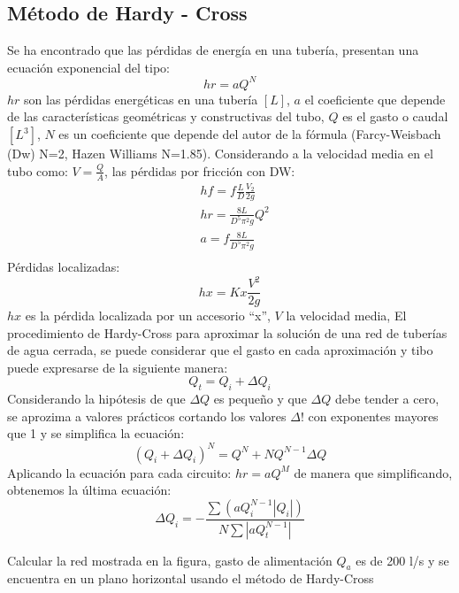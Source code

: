 \subsection{Método de Hardy - Cross}

Se ha encontrado que las pérdidas de energía en una tubería, presentan una ecuación exponencial del tipo:
\begin{equation}
    hr = aQ^N
\end{equation}
$hr$ son las pérdidas energéticas en una tubería $[L]$, $a$ el coeficiente que depende de las características geométricas y constructivas del tubo, $Q$ es el gasto o caudal $[L^3]$, $N$ es un coeficiente que depende del autor de la fórmula (Farcy-Weisbach (Dw) N=2, Hazen Williams N=1.85). Considerando a la velocidad media en el tubo como: $V=\frac{Q}{A}$, las pérdidas por fricción con DW:
\begin{align*}
    &hf = f\frac{L}{D}\frac{V_2}{2g}\\
    &hr = \frac{8L}{D^5\pi^2g}Q^2\\
    &a = f\frac{8L}{D^5\pi^2g}\\
\end{align*}
Pérdidas localizadas:
\begin{equation}
    hx = Kx\frac{V^2}{2g}
\end{equation}
$hx$ es la pérdida localizada por un accesorio ``x'', $V$ la velocidad media,
El procedimiento de Hardy-Cross para aproximar la solución de una red de tuberías de agua cerrada, se puede considerar que el gasto en cada aproximación y tibo puede expresarse de la siguiente manera:
\begin{equation}
    Q_t = Q_i+\Delta Q_i
\end{equation}
Considerando la hipótesis de que $\Delta Q$ es pequeño y que $\Delta Q$ debe tender a cero, se aprozima a valores prácticos cortando los valores $\Delta !$ con exponentes mayores que 1 y se simplifica la ecuación:
\begin{equation}
    \left(Q_i +\Delta Q_i\right)^N = Q^N + NQ^{N -1}\Delta Q
\end{equation} 
Aplicando la ecuación para cada circuito: $hr=aQ^M$
de manera que simplificando, obtenemos la última ecuación:
\begin{equation}
    \Delta Q_i =-\frac{\sum \left(aQ_i^{N -1} \left\lvert Q_i\right\rvert \right)}{N\sum \left\lvert aQ_t^{N -1}\right\rvert}
\end{equation}
\begin{example}
    Calcular la red mostrada en la figura, gasto de alimentación $Q_a$ es de 200 l/s y se encuentra en un plano horizontal usando el método de Hardy-Cross
    
\end{example}


